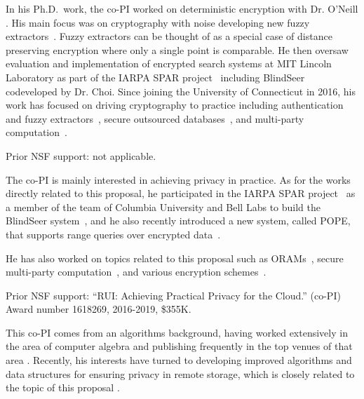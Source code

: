 \documentclass[11pt]{article}
\theoremstyle{remark}
\begin{document}
In his Ph.D.~work, the co-PI worked on deterministic encryption with Dr. O'Neill \cite{TCC:FulNeiRey12,JC:FulONeRey15}.  His main focus was on cryptography with noise developing new fuzzy extractors~\cite{AC:FulMenRey13,AC:FulReySmi16,EC:CFPRS16}.  Fuzzy extractors can be thought of as a special case of distance preserving encryption where only a single point is comparable.  He then oversaw evaluation and implementation of encrypted search systems at MIT Lincoln Laboratory as part of the IARPA SPAR project~\cite{spar_baa} including BlindSeer codeveloped by Dr. Choi.  Since joining the University of Connecticut in 2016, his work has focused on driving cryptography to practice including authentication and fuzzy extractors~\cite{EPRINT:HFDD17,EPRINT:BKFY17,EPRINT:ABCFG16}, secure outsourced databases~\cite{SP:FVYSHG17}, and multi-party computation~\cite{EPRINT:CunFulYak16}.  

Prior NSF support: not applicable.

The co-PI is mainly interested in achieving privacy in practice. As for the
works directly related to this proposal, he participated in the IARPA SPAR
project~\cite{spar_baa} as a member of the team of Columbia University and Bell
Labs to build the BlindSeer system~\cite{SP:PKVKMC14}, and he also recently
introduced a new system, called POPE, that supports range queries over
encrypted data~\cite{CCS:RACY16}.  

He has also worked on topics related to this proposal such as
ORAMs~\cite{SP:RocAviCho16,NDSS:ACMR17,CCS:RACM17}, secure multi-party
computation~\cite{AC:CEJMY07,TCC:CDMW09,AC:CEMY09,RSA:CHKMR12,TCC:CKKZ12,PKC:CKWZ13,C:CKMZ14,TCC:CKSYZ14},
and various encryption schemes~\cite{TCC:CDMW08,AC:CDMW09,AC:LCLPY13}. 

Prior NSF support: ``RUI: Achieving Practical Privacy for the Cloud.'' (co-PI) Award number 1618269, 2016-2019, \$355K. 

This co-PI comes from an algorithms background, having worked
extensively in the area of computer algebra and publishing frequently in
the top venues of that area
\cite{Roc09,Roc11,GR10,GR11,GR11a,GRT10,GRT12,HR10,AGR14,AR14,AGR15}. Recently, his interests have turned to
developing improved algorithms and data structures for ensuring privacy
in remote storage, which is closely related to the topic of this
proposal
\cite{SP:RocAviCho16,CCS:RACY16,NDSS:ACMR17,CCS:RACM17}.
\end{document}
